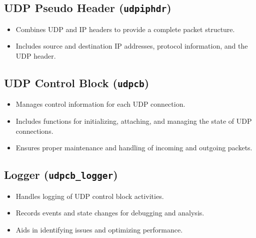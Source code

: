\subsection{UDP Pseudo Header (\texttt{udpiphdr})}
\begin{itemize}
    \item Combines UDP and IP headers to provide a complete packet structure.
    \item Includes source and destination IP addresses, protocol information, and the UDP header.
\end{itemize}

\subsection{UDP Control Block (\texttt{udpcb})}
\begin{itemize}
    \item Manages control information for each UDP connection.
    \item Includes functions for initializing, attaching, and managing the state of UDP connections.
    \item Ensures proper maintenance and handling of incoming and outgoing packets.
\end{itemize}

\subsection{Logger (\texttt{udpcb\_logger})}
\begin{itemize}
    \item Handles logging of UDP control block activities.
    \item Records events and state changes for debugging and analysis.
    \item Aids in identifying issues and optimizing performance.
\end{itemize}
